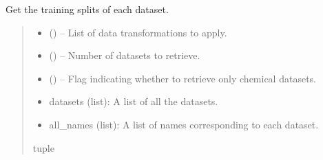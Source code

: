 \documentclass[letterpaper,10pt,english]{sphinxhowto}
\begin{document}

\begin{fulllineitems}
\label{\detokenize{datasets/loaders:datasets.loaders.get_train_datasets}}
\pysigstartsignatures
{}
\pysigstopsignatures
\sphinxAtStartPar
Get the training splits of each dataset.
\begin{quote}\begin{description}
\begin{itemize}
\item {} 
\sphinxAtStartPar
{} () – List of data transformations to apply.

\item {} 
\sphinxAtStartPar
{} () – Number of datasets to retrieve.

\item {} 
\sphinxAtStartPar
{} () – Flag indicating whether to retrieve only chemical datasets.

\end{itemize}

\sphinxAtStartPar
\begin{description}
\begin{itemize}
\item {} 
\sphinxAtStartPar
datasets (list): A list of all the datasets.

\item {} 
\sphinxAtStartPar
all\_names (list): A list of names corresponding to each dataset.

\end{itemize}

\end{description}


\sphinxAtStartPar
tuple

\end{description}\end{quote}

\end{fulllineitems}
\end{document}
